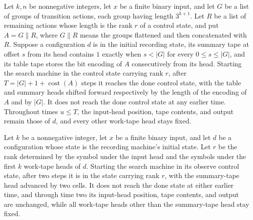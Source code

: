 \begin{lemma}
\label{Turing.StepBlock.seekTM_groups}
\leanok
{}
Let $k,n$ be nonnegative integers, let $x$ be a finite binary input, and let $G$ be a
list of groups of transition actions, each group having length $3^{k+1}$. Let $R$ be a
list of remaining actions whose length is the rank $r$ of a control state, and put
$A=G\mathbin{\|}R$, where $G\mathbin{\|}R$ means the groups flattened and then
concatenated with $R$. Suppose a configuration $d$ is in the initial recording state,
its summary tape at offset $s$ from its head contains $1$ exactly when $s<|G|$ for every
$0\le s\le |G|$, and its table tape stores the bit encoding of $A$ consecutively from
its head. Starting the search machine in the control state carrying rank $r$, after
$T=|G|+1+\operatorname{cost}(A)$ steps it reaches the done control state, with the table
and summary heads shifted forward respectively by the length of the encoding of $A$ and
by $|G|$. It does not reach the done control state at any earlier time. Throughout times
$u\le T$, the input-head position, tape contents, and output remain those of $d$, and
every other work-tape head stays fixed.
\end{lemma}

\begin{lemma}
\label{Turing.StepBlock.seekTM_observe}
\leanok
{}
Let $k$ be a nonnegative integer, let $x$ be a finite binary input, and let $d$ be a
configuration whose state is the recording machine's initial state. Let $r$ be the rank
determined by the symbol under the input head and the symbols under the first $k$
work-tape heads of $d$. Starting the search machine in its observe control state, after
two steps it is in the state carrying rank $r$, with the summary-tape head advanced by
two cells. It does not reach the done state at either earlier time, and through time two
its input-head position, tape contents, and output are unchanged, while all work-tape
heads other than the summary-tape head stay fixed.
\end{lemma}

